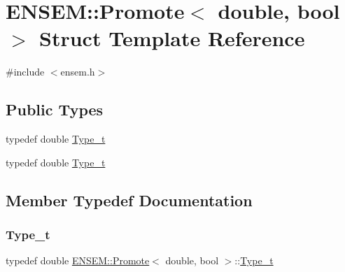 \hypertarget{structENSEM_1_1Promote_3_01double_00_01bool_01_4}{}\section{E\+N\+S\+EM\+:\+:Promote$<$ double, bool $>$ Struct Template Reference}
\label{structENSEM_1_1Promote_3_01double_00_01bool_01_4}


{\ttfamily \#include $<$ensem.\+h$>$}

\subsection*{Public Types}
\begin{DoxyCompactItemize}
\item 
typedef double \mbox{\hyperlink{structENSEM_1_1Promote_3_01double_00_01bool_01_4_a14edc84a3688511a1539a90f9f319384}{Type\+\_\+t}}
\item 
typedef double \mbox{\hyperlink{structENSEM_1_1Promote_3_01double_00_01bool_01_4_a14edc84a3688511a1539a90f9f319384}{Type\+\_\+t}}
\end{DoxyCompactItemize}


\subsection{Member Typedef Documentation}
\mbox{\label{structENSEM_1_1Promote_3_01double_00_01bool_01_4_a14edc84a3688511a1539a90f9f319384}} 
\subsubsection{\texorpdfstring{Type\_t}{Type\_t}\hspace{0.1cm}{\footnotesize\ttfamily [1/2]}}
{\footnotesize\ttfamily typedef double \mbox{\hyperlink{structENSEM_1_1Promote}{E\+N\+S\+E\+M\+::\+Promote}}$<$ double, bool $>$\+::\mbox{\hyperlink{structENSEM_1_1Promote_3_01double_00_01bool_01_4_a14edc84a3688511a1539a90f9f319384}{Type\+\_\+t}}}

\mbox{\label{structENSEM_1_1Promote_3_01double_00_01bool_01_4_a14edc84a3688511a1539a90f9f319384}} 
